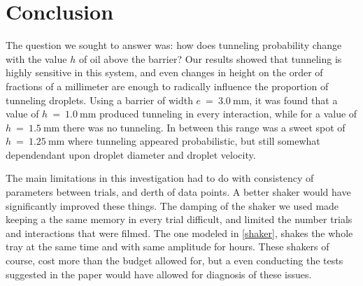 \chapter*{Conclusion}
	\setcounter{chapter}{4}
	\setcounter{section}{0}
	


The question we sought to answer was: how does tunneling probability change with the value $h$ of oil above the barrier? Our results showed that tunneling is highly sensitive in this system, and even changes in height on the order of fractions of a millimeter are enough to radically influence the proportion of tunneling droplets. Using a barrier of width $e~=~3.0~\mathrm{mm}$, it was found that a value of $h~=~1.0~\mathrm{mm}$ produced tunneling in every interaction, while for a value of $h~=~1.5~\mathrm{mm}$ there was no tunneling. In between this range was a sweet spot of $h~=~1.25~\mathrm{mm}$ where tunneling appeared probabilistic, but still somewhat dependendant upon droplet diameter and droplet velocity. 


The main limitations in this investigation had to do with consistency of parameters between trials, and derth of data points. A better shaker would have significantly improved these things. The damping of the shaker we used made keeping a the same memory in every trial difficult, and limited the number trials and interactions that were filmed. The one modeled in \ref{shaker}, shakes the whole tray at the same time and with same amplitude for hours. These shakers of course, cost more than the budget allowed for, but a even conducting the tests suggested in the paper would have allowed for diagnosis of these issues.

